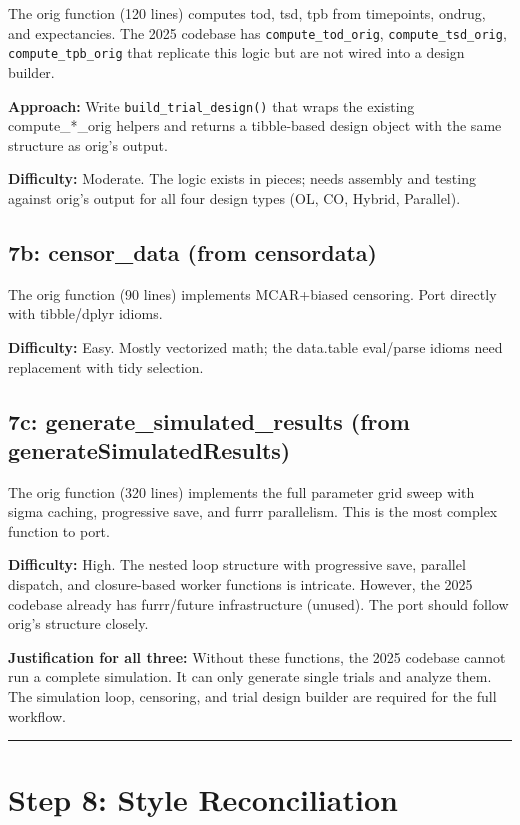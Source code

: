 \documentclass[11pt]{article}
\begin{document}
The orig function (120 lines) computes tod, tsd, tpb from
timepoints, ondrug, and expectancies. The 2025 codebase has
\texttt{compute\_tod\_orig}, \texttt{compute\_tsd\_orig}, \texttt{compute\_tpb\_orig} that
replicate this logic but are not wired into a design builder.

\textbf{Approach:} Write \texttt{build\_trial\_design()} that wraps the existing
compute\_*\_orig helpers and returns a tibble-based design object
with the same structure as orig's output.

\textbf{Difficulty:} Moderate. The logic exists in pieces; needs assembly
and testing against orig's output for all four design types
(OL, CO, Hybrid, Parallel).

\subsection{7b: censor\_data (from censordata)}

The orig function (90 lines) implements MCAR+biased censoring.
Port directly with tibble/dplyr idioms.

\textbf{Difficulty:} Easy. Mostly vectorized math; the data.table
eval/parse idioms need replacement with tidy selection.

\subsection{7c: generate\_simulated\_results (from generateSimulatedResults)}

The orig function (320 lines) implements the full parameter grid
sweep with sigma caching, progressive save, and furrr parallelism.
This is the most complex function to port.

\textbf{Difficulty:} High. The nested loop structure with progressive
save, parallel dispatch, and closure-based worker functions is
intricate. However, the 2025 codebase already has furrr/future
infrastructure (unused). The port should follow orig's structure
closely.

\textbf{Justification for all three:} Without these functions, the 2025
codebase cannot run a complete simulation. It can only generate
single trials and analyze them. The simulation loop, censoring,
and trial design builder are required for the full workflow.

\bigskip\noindent\rule{\textwidth}{0.4pt}\bigskip

\section{Step 8: Style Reconciliation}
\end{document}
